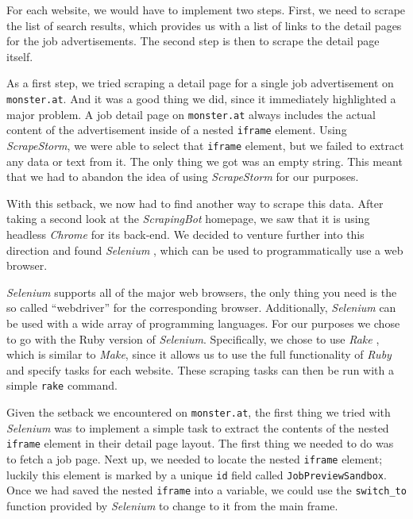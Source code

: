 \documentclass[runningheads]{llncs}
\begin{document}
For each website, we would have to implement two steps. First, we need to scrape the list of search results, which provides us with a list of links to the detail pages for the job advertisements. The second step is then to scrape the detail page itself.

As a first step, we tried scraping a detail page for a single job advertisement on \texttt{monster.at}. And it was a good thing we did, since it immediately highlighted a major problem. A job detail page on \texttt{monster.at} always includes the actual content of the advertisement inside of a nested \texttt{iframe} element. Using \textit{ScrapeStorm}, we were able to select that \texttt{iframe} element, but we failed to extract any data or text from it. The only thing we got was an empty string. This meant that we had to abandon the idea of using \textit{ScrapeStorm} for our purposes.

With this setback, we now had to find another way to scrape this data. After taking a second look at the \textit{ScrapingBot} homepage, we saw that it is using headless \textit{Chrome} for its back-end. We decided to venture further into this direction and found \textit{Selenium} \cite{selenium}, which can be used to programmatically use a web browser.

\textit{Selenium} supports all of the major web browsers, the only thing you need is the so called “webdriver” for the corresponding browser. Additionally, \textit{Selenium} can be used with a wide array of programming languages. For our purposes we chose to go with the Ruby version of \textit{Selenium}. Specifically, we chose to use \textit{Rake} \cite{rake}, which is similar to \textit{Make}, since it allows us to use the full functionality of \textit{Ruby} \cite{ruby} and specify tasks for each website. These scraping tasks can then be run with a simple \texttt{rake} command.

Given the setback we encountered on \texttt{monster.at}, the first thing we tried with \textit{Selenium} was to implement a simple task to extract the contents of the nested \texttt{iframe} element in their detail page layout. The first thing we needed to do was to fetch a job page. Next up, we needed to locate the nested \texttt{iframe} element; luckily this element is marked by a unique \texttt{id} field called \texttt{JobPreviewSandbox}. Once we had saved the nested \texttt{iframe} into a variable, we could use the \texttt{switch\_to} function provided by \textit{Selenium} to change to it from the main frame.
\end{document}
